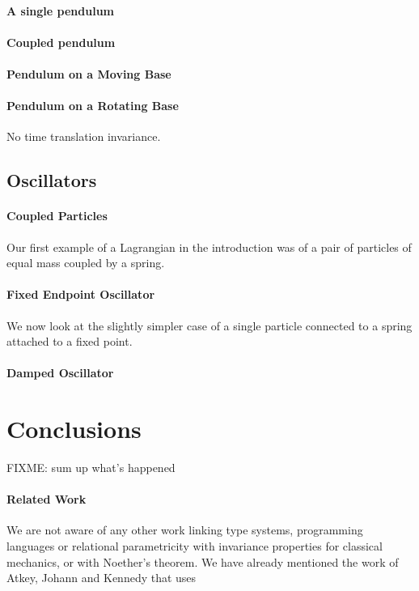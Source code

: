\documentclass[preprint]{sigplanconf}
\theoremstyle{examplestyle}
\begin{document}
\paragraph{A single pendulum}

\paragraph{Coupled pendulum}

\paragraph{Pendulum on a Moving Base}

\paragraph{Pendulum on a Rotating Base}

No time translation invariance.

\subsection{Oscillators}

\paragraph{Coupled Particles} Our first example of a Lagrangian in the
introduction was of a pair of particles of equal mass coupled by a
spring.

\paragraph{Fixed Endpoint Oscillator} We now look at the slightly
simpler case of a single particle connected to a spring attached to a
fixed point.

\paragraph{Damped Oscillator}

\section{Conclusions}
\label{sec:conclusions}

FIXME: sum up what's happened

\paragraph{Related Work} We are not aware of any other work linking
type systems, programming languages or relational parametricity with
invariance properties for classical mechanics, or with Noether's
theorem. We have already mentioned the work of Atkey, Johann and
Kennedy \cite{atkey13abstraction} that uses 
\end{document}
